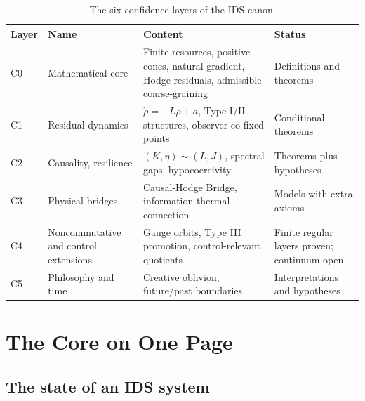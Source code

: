 \documentclass[11pt,a4paper]{article}
\theoremstyle{plain}
\begin{document}
\begin{table}[htbp]
\centering\small
\begin{tabularx}{\textwidth}{@{}l l Y Y@{}}
\toprule
Layer & Name & Content & Status \\
\midrule
C0 & Mathematical core & Finite resources, positive cones, natural gradient, Hodge residuals, admissible coarse-graining & Definitions and theorems \\
C1 & Residual dynamics & $\dot\rho=-L\rho+a$, Type I/II structures, observer co-fixed points & Conditional theorems \\
C2 & Causality, resilience & $(K,\eta)\sim(L,J)$, spectral gaps, hypocoercivity & Theorems plus hypotheses \\
C3 & Physical bridges & Causal-Hodge Bridge, information-thermal connection & Models with extra axioms \\
C4 & Noncommutative and control extensions & Gauge orbits, Type III promotion, control-relevant quotients & Finite regular layers proven; continuum open \\
C5 & Philosophy and time & Creative oblivion, future/past boundaries & Interpretations and hypotheses \\
\bottomrule
\end{tabularx}
\caption{The six confidence layers of the IDS canon.}
\label{tab:layers}
\end{table}

\section{The Core on One Page}\label{sec:core}

\subsection{The state of an IDS system}
\end{document}
